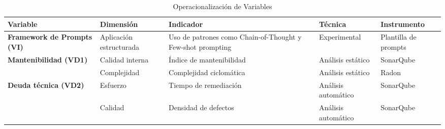 \begin{table}[H]
\centering
\caption{Operacionalización de Variables}
\renewcommand{\arraystretch}{1.3}
\begin{tabularx}{\textwidth}{
p{2.8cm} 
p{2.8cm} 
>{\RaggedRight\arraybackslash}X 
p{2.2cm} 
p{2.2cm}
}
\toprule
\textbf{Variable} & \textbf{Dimensión} & \textbf{Indicador} & \textbf{Técnica} & \textbf{Instrumento} \\
\midrule

\textbf{Framework de Prompts (VI)} 
& Aplicación estructurada 
& Uso de patrones como Chain-of-Thought y Few-shot prompting 
& Experimental 
& Plantilla de prompts \\

\midrule

\textbf{Mantenibilidad (VD1)} 
& Calidad interna 
& Índice de mantenibilidad 
& Análisis estático 
& SonarQube \\
& Complejidad 
& Complejidad ciclomática 
& Análisis estático 
& Radon \\

\midrule

\textbf{Deuda técnica (VD2)} 
& Esfuerzo 
& Tiempo de remediación 
& Análisis automático 
& SonarQube \\
& Calidad 
& Densidad de defectos 
& Análisis automático 
& SonarQube \\

\bottomrule
\end{tabularx}
\end{table}